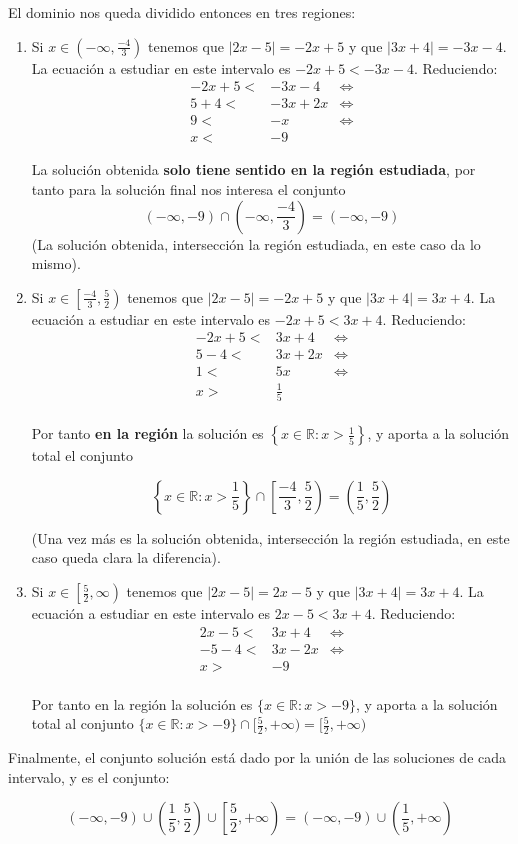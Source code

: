 \documentclass[10pt,a4paper]{article}
\begin{document}
El dominio nos queda dividido entonces en tres regiones:
\begin{enumerate}
\item
  Si $x \in \left(-\infty, \frac{-4}{3}\right)$ tenemos que $|2x-5| = -2x+5$ y que
  $|3x+4| = -3x-4$.
  La ecuación a estudiar en este intervalo es $ -2x+5 < -3x-4$.
  Reduciendo:
  \begin{align*}
    -2x+5 <& -3x-4    & \iff \\
    5 + 4 <& -3x + 2x & \iff \\
    9     <& -x       & \iff \\
    x     <& -9 &
  \end{align*}

  La solución obtenida {\bf solo tiene sentido en la región estudiada},
  por tanto para la solución final nos interesa el conjunto
  $$(-\infty, -9) \cap \left(-\infty, \frac{-4}{3}\right) = (-\infty, -9)$$
  (La solución obtenida, intersección la región estudiada, en este caso da
  lo mismo).
  
\item
  Si $x \in \left[\frac{-4}{3}, \frac{5}{2}\right)$ tenemos que $|2x-5| = -2x+5$ y que
  $|3x+4| = 3x+4$.
  La ecuación a estudiar en este intervalo es $ -2x+5 < 3x+4$.
  Reduciendo:
  \begin{align*}
    -2x+5  <& 3x+4     & \iff \\
     5 - 4 <& 3x + 2 x & \iff \\
     1     <& 5x       & \iff \\
     x     >& \frac{1}{5} &\\
  \end{align*}

  Por tanto {\bf en la región} la solución es
  $\left\lbrace x\in \mathbb{R} : x > \frac{1}{5}\right\rbrace$, y aporta a la solución total
  el conjunto \newline
  
  $$\left\lbrace x\in \mathbb{R} : x > \frac{1}{5}\right\rbrace \cap \left[\frac{-4}{3}, \frac{5}{2}\right)   = \left(\frac{1}{5}, \frac{5}{2}\right)$$

  (Una vez más es la solución obtenida, intersección la región estudiada,
  en este caso queda clara la diferencia).
  

\item
  Si $x \in \left[\frac{5}{2},\infty\right)$ tenemos que $|2x-5| = 2x-5$ y que
  $|3x+4| = 3x+4$.
  La ecuación a estudiar en este intervalo es $ 2x-5 < 3x+4$.
  Reduciendo:
  \begin{align*}
    2x-5  <& 3x+4       & \iff \\
     -5 - 4 <& 3x - 2 x & \iff \\
     x >& -9 \\
  \end{align*}

  \noindent
  Por tanto en la región la solución es
  $\{ x\in \mathbb{R} : x > -9 \}$, y aporta a la solución total al conjunto
  $\{ x\in \mathbb{R} : x > -9 \} \cap [\frac{5}{2},+\infty)
    = [\frac{5}{2},+\infty)$
  
\end{enumerate}

Finalmente, el conjunto solución está dado por la unión de las soluciones
de cada intervalo, y es el conjunto:

$$(-\infty, -9) \cup \left(\frac{1}{5}, \frac{5}{2}\right) \cup \left[\frac{5}{2},+\infty\right)
  = (-\infty, -9) \cup \left(\frac{1}{5}, +\infty\right)$$
\end{document}
